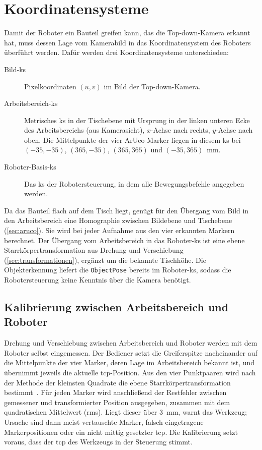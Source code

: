 \section{Koordinatensysteme}
\label{sec:koordinatensysteme}

Damit der Roboter ein Bauteil greifen kann, das die Top-down-Kamera erkannt hat, muss
dessen Lage vom Kamerabild in das Koordinatensystem des Roboters überführt werden. Dafür
werden drei Koordinatensysteme unterschieden:

\begin{description}
  \item[Bild-\ac{ks}] Pixelkoordinaten $(u, v)$ im Bild der Top-down-Kamera.
  \item[Arbeitsbereich-\ac{ks}] Metrisches \ac{ks} in der Tischebene mit Ursprung in der
    linken unteren Ecke des Arbeitsbereichs (aus Kamerasicht), $x$-Achse nach rechts,
    $y$-Achse nach oben. Die Mittelpunkte der vier ArUco-Marker liegen in diesem \ac{ks} bei
    $(-35, -35)$, $(365, -35)$, $(365, 365)$ und $(-35, 365)$~\si{\milli\metre}.
  \item[Roboter-Basis-\ac{ks}] Das \ac{ks} der Robotersteuerung, in dem alle Bewegungsbefehle
    angegeben werden.
\end{description}

Da das Bauteil flach auf dem Tisch liegt, genügt für den Übergang vom Bild in den
Arbeitsbereich eine Homographie zwischen Bildebene und Tischebene
(\cref{sec:aruco}). Sie wird bei jeder Aufnahme aus den vier erkannten Markern berechnet.
Der Übergang vom Arbeitsbereich in das Roboter-\ac{ks} ist eine ebene
Starrkörpertransformation aus Drehung und Verschiebung (\cref{sec:transformationen}), ergänzt
um die bekannte Tischhöhe. Die Objekterkennung liefert die \texttt{ObjectPose} bereits im
Roboter-\ac{ks}, sodass die Robotersteuerung keine Kenntnis über die Kamera benötigt.

\subsection*{Kalibrierung zwischen Arbeitsbereich und Roboter}

Drehung und Verschiebung zwischen Arbeitsbereich und Roboter werden mit dem Roboter selbst
eingemessen. Der Bediener setzt die Greiferspitze nacheinander auf die Mittelpunkte der vier
Marker, deren Lage im Arbeitsbereich bekannt ist, und übernimmt jeweils die aktuelle
\ac{tcp}-Position. Aus den vier Punktpaaren wird nach der Methode der kleinsten Quadrate die
ebene Starrkörpertransformation bestimmt~\cite{umeyama1991}. Für jeden Marker wird
anschließend der Restfehler zwischen gemessener und transformierter Position ausgegeben,
zusammen mit dem quadratischen Mittelwert (\ac{rms}). Liegt dieser über \SI{3}{\milli\metre},
warnt das Werkzeug; Ursache sind dann meist vertauschte Marker, falsch eingetragene
Markerpositionen oder ein nicht mittig gesetzter \ac{tcp}. Die Kalibrierung setzt voraus,
dass der \ac{tcp} des Werkzeugs in der Steuerung stimmt.

